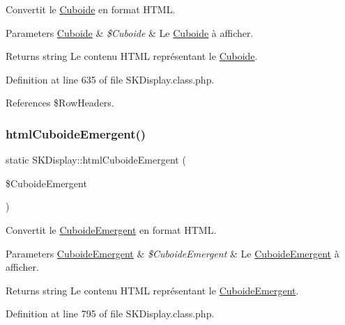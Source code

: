 Convertit le \hyperlink{class_cuboide}{Cuboide} en format H\+T\+ML.


\begin{DoxyParams}[1]{Parameters}
\hyperlink{class_cuboide}{Cuboide} & {\em \$\+Cuboide} & Le \hyperlink{class_cuboide}{Cuboide} à afficher. \\
\hline
\end{DoxyParams}
\begin{DoxyReturn}{Returns}
string Le contenu H\+T\+ML représentant le \hyperlink{class_cuboide}{Cuboide}. 
\end{DoxyReturn}


Definition at line 635 of file S\+K\+Display.\+class.\+php.



References \$\+Row\+Headers.

\mbox{\label{class_s_k_display_a063cc1eec4ae734ab5592b7422887fb3}} 
\subsubsection{\texorpdfstring{html\+Cuboide\+Emergent()}{htmlCuboideEmergent()}}
{\footnotesize\ttfamily static S\+K\+Display\+::html\+Cuboide\+Emergent (\begin{DoxyParamCaption}\item[{}]{\$\+Cuboide\+Emergent }\end{DoxyParamCaption})\hspace{0.3cm}{\ttfamily [static]}}

Convertit le \hyperlink{class_cuboide_emergent}{Cuboide\+Emergent} en format H\+T\+ML.


\begin{DoxyParams}[1]{Parameters}
\hyperlink{class_cuboide_emergent}{Cuboide\+Emergent} & {\em \$\+Cuboide\+Emergent} & Le \hyperlink{class_cuboide_emergent}{Cuboide\+Emergent} à afficher. \\
\hline
\end{DoxyParams}
\begin{DoxyReturn}{Returns}
string Le contenu H\+T\+ML représentant le \hyperlink{class_cuboide_emergent}{Cuboide\+Emergent}. 
\end{DoxyReturn}


Definition at line 795 of file S\+K\+Display.\+class.\+php.

